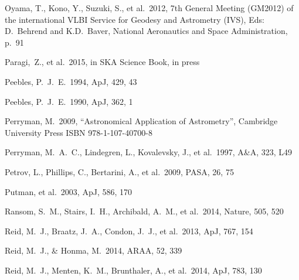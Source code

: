 \begin{thebibliography}{99}
\begin{multicols}{2}
{ Oyama, T., Kono, Y., Suzuki, S., et al.\ 2012, 
7th General Meeting (GM2012) of the international VLBI Service for Geodesy and Astrometry (IVS), 
Eds: D.~Behrend and K.D.~Baver, National Aeronautics and Space Administration, p.~91 

 Paragi,~Z., et al.\ 2015, in SKA Science Book, in press

 Peebles, P.~J.~E.\ 1994, ApJ, 429, 43 

 Peebles, P.~J.~E.\ 1990, ApJ, 362, 1 


Perryman, M.\ 2009, “Astronomical Application of Astrometry”, Cambridge University Press ISBN 978-1-107-40700-8

Perryman, M.~A.~C., Lindegren, L., Kovalevsky, J., et al.\ 1997, A\&A, 323, L49 

 Petrov, L., Phillips, C., Bertarini, A., et al.\ 2009, PASA, 26, 75 

 Putman, et al.\ 2003, ApJ, 586, 170 

 Ransom, S.~M., Stairs, I.~H., Archibald, A.~M., et al.\ 2014, Nature, 505, 520 

 Reid, M.~J., Braatz, J.~A., Condon, J.~J., et al.\ 2013, ApJ, 767, 154 

 Reid, M.~J., \& Honma, M.\ 2014, ARAA, 52, 339 



 Reid, M.~J., Menten, K.~M., Brunthaler, A., et al.\ 2014, ApJ, 783, 130 


}
\end{multicols}
\end{thebibliography}
